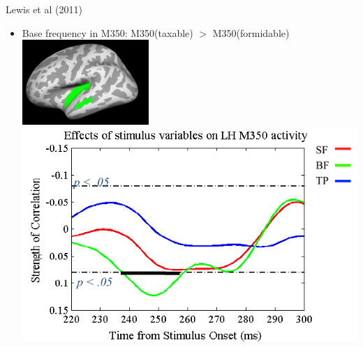 {\begin{block}{Lewis et al (2011)}
\begin{itemize}
			\item Base frequency in M350: M350(taxable) $>$ M350(formidable)\\ \includegraphics[height=0.3\textheight]{figs/lewis350roi.png} \phantom{aaa} \includegraphics[height=0.3\textheight]{figs/lewis350res.png}
		\end{itemize}
	\end{block}
}


